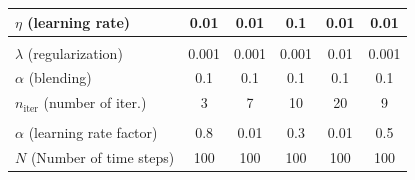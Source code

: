 \documentclass{article} %
\theoremstyle{definition}
\begin{document}
\begin{table}[htb]
{\begin{tabular}{lccccc}
            $\eta$ (learning rate)& 0.01 & 0.01 & 0.1& 0.01 & 0.01\\ \hline
            \cellcolor{gray!20}{D-Flow} & & & & & \\
            $\lambda$ (regularization) & 0.001 & 0.001 & 0.001& 0.01 & 0.001 \\ 
            $\alpha$ (blending) & 0.1 & 0.1 & 0.1& 0.1 & 0.1 \\
            $n_\text{iter}$ (number of iter.) & 3 & 7 & 10 & 20 & 9 \\ \hline
            \cellcolor{gray!20}{PnP-Flow} & & & & & \\ 
            $\alpha$ (learning rate factor) & 0.8 & 0.01 & 0.3 & 0.01 & 0.5\\
            $N$ (Number of time steps) & 100 & 100 & 100 & 100 & 100\\
            \bottomrule
        \end{tabular}    
    }       
\end{table}
\end{document}
